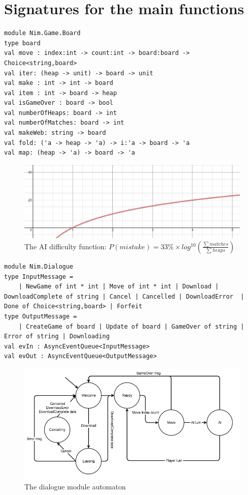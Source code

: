 \documentclass[12pt]{article}
\begin{document}
\section*{Signatures for the main functions}
\begin{lstlisting}
module Nim.Game.Board
type board
val move : index:int -> count:int -> board:board -> Choice<string,board>
val iter: (heap -> unit) -> board -> unit
val make : int -> int -> board
val item : int -> board -> heap
val isGameOver : board -> bool
val numberOfHeaps: board -> int
val numberOfMatches: board -> int
val makeWeb: string -> board
val fold: ('a -> heap -> 'a) -> i:'a -> board -> 'a
val map: (heap -> 'a) -> board -> 'a 
\end{lstlisting}
\begin{figure}[!h]
\begin{center}
\includegraphics[scale=.40]{graphlogx.png}
\caption{The AI difficulty function: $P(mistake) = 33\% \times log^{10}(\frac{\sum matches} {\sum heaps} )$}
\end{center}
\label{fig:ai}
\end{figure}
\begin{lstlisting}
module Nim.Dialogue
type InputMessage =
    | NewGame of int * int | Move of int * int | Download | DownloadComplete of string | Cancel | Cancelled | DownloadError  | Done of Choice<string,board> | Forfeit
type OutputMessage =
    | CreateGame of board | Update of board | GameOver of string | Error of string | Downloading
val evIn : AsyncEventQueue<InputMessage>
val evOut : AsyncEventQueue<OutputMessage>
\end{lstlisting}
\begin{figure}[ht]
\begin{center}
\includegraphics[scale=.64]{img/state_machine_nim.png}
\caption{The dialogue module automaton}
\end{center}
\label{fig:automaton}
\end{figure}
\end{document}
